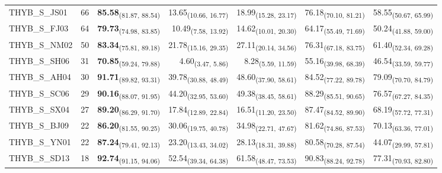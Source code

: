 \begin{table}[p]
\begin{tabular}{llrrrrr}
THYB\_S\_JS01 & 66 & \textbf{85.58}\textsubscript{(81.87, 88.54)} & 13.65\textsubscript{(10.66, 16.77)} & 18.99\textsubscript{(15.28, 23.17)} & 76.18\textsubscript{(70.10, 81.21)} & 58.55\textsubscript{(50.67, 65.99)} \\
THYB\_S\_FJ03 & 64 & \textbf{79.73}\textsubscript{(74.98, 83.85)} & 10.49\textsubscript{(7.58, 13.92)} & 14.62\textsubscript{(10.01, 20.30)} & 64.17\textsubscript{(55.49, 71.69)} & 50.24\textsubscript{(41.88, 59.00)} \\
THYB\_S\_NM02 & 50 & \textbf{83.34}\textsubscript{(75.81, 89.18)} & 21.78\textsubscript{(15.16, 29.35)} & 27.11\textsubscript{(20.14, 34.56)} & 76.31\textsubscript{(67.18, 83.75)} & 61.40\textsubscript{(52.34, 69.28)} \\
THYB\_S\_SH06 & 31 & \textbf{70.85}\textsubscript{(59.24, 79.88)} & 4.60\textsubscript{(3.47, 5.86)} & 8.28\textsubscript{(5.59, 11.59)} & 55.16\textsubscript{(39.98, 68.39)} & 46.54\textsubscript{(33.59, 59.77)} \\
THYB\_S\_AH04 & 30 & \textbf{91.71}\textsubscript{(89.82, 93.31)} & 39.78\textsubscript{(30.88, 48.49)} & 48.60\textsubscript{(37.90, 58.61)} & 84.52\textsubscript{(77.22, 89.78)} & 79.09\textsubscript{(70.70, 84.79)} \\
THYB\_S\_SC06 & 29 & \textbf{90.16}\textsubscript{(88.07, 91.95)} & 44.20\textsubscript{(32.95, 53.60)} & 49.38\textsubscript{(38.45, 58.61)} & 88.29\textsubscript{(85.51, 90.65)} & 76.57\textsubscript{(67.27, 84.35)} \\
THYB\_S\_SX04 & 27 & \textbf{89.20}\textsubscript{(86.29, 91.70)} & 17.84\textsubscript{(12.89, 22.84)} & 16.51\textsubscript{(11.20, 23.50)} & 87.47\textsubscript{(84.52, 89.90)} & 68.19\textsubscript{(57.72, 77.31)} \\
THYB\_S\_BJ09 & 22 & \textbf{86.20}\textsubscript{(81.55, 90.25)} & 30.06\textsubscript{(19.75, 40.78)} & 34.98\textsubscript{(22.71, 47.67)} & 81.62\textsubscript{(74.86, 87.53)} & 70.13\textsubscript{(63.36, 77.01)} \\
THYB\_S\_YN01 & 22 & \textbf{87.24}\textsubscript{(79.41, 92.13)} & 23.20\textsubscript{(13.43, 34.02)} & 28.13\textsubscript{(18.31, 39.88)} & 80.58\textsubscript{(70.28, 87.54)} & 44.07\textsubscript{(29.99, 57.81)} \\
THYB\_S\_SD13 & 18 & \textbf{92.74}\textsubscript{(91.15, 94.06)} & 52.54\textsubscript{(39.34, 64.38)} & 61.58\textsubscript{(48.47, 73.53)} & 90.83\textsubscript{(88.24, 92.78)} & 77.31\textsubscript{(70.93, 82.80)} \\

\end{tabular}
\end{table}
